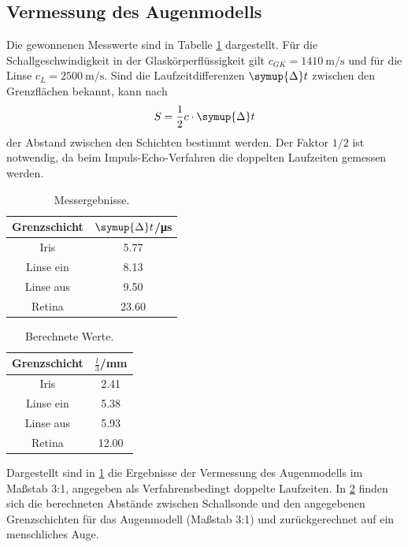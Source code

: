 \documentclass[
  bibliography=totoc,     %
  captions=tableheading,  %
  titlepage=firstiscover, %
]{scrartcl}
\begin{document}
\subsection{Vermessung des Augenmodells}
Die gewonnenen Messwerte sind in Tabelle \ref{tab:3} dargestellt. Für die Schallgeschwindigkeit\cite{anleitung}
in der Glaskörperflüssigkeit gilt $c_{GK} = \SI[per-mode=reciprocal]{1410}{\metre\per\second}$
und für die Linse $c_L = \SI[per-mode=reciprocal]{2500}{\metre\per\second}$. Sind die
Laufzeitdifferenzen $\symup{\Delta}t$ zwischen den Grenzflächen bekannt, kann nach
\begin{equation}
  S = \frac{1}{2} c \cdot \symup{\Delta}t
\end{equation}
der Abstand zwischen den Schichten bestimmt werden. Der Faktor $1/2$ ist notwendig,
da beim Impuls-Echo-Verfahren die doppelten Laufzeiten gemessen werden.
\begin{table}
\centering
  \begin{tabular}{c c}
    \toprule
    Grenzschicht & $\symup{\Delta}t$/\si{\micro\second} \\
    \midrule
    Iris & 5.77 \\
    Linse ein & 8.13 \\
    Linse aus & 9.50 \\
    Retina & 23.60 \\
    \bottomrule
  \end{tabular}
  \caption{Messergebnisse.}
  \label{tab:3}
\end{table}
\begin{table}
  \centering
  \begin{tabular}{c c}
    \toprule
    Grenzschicht & $\frac{l}{3}$/\si{\milli\metre} \\
    \midrule
    Iris & 2.41\\
    Linse ein & 5.38\\
    Linse aus & 5.93\\
    Retina & 12.00\\
    \bottomrule
  \end{tabular}
  \caption{Berechnete Werte.}
  \label{tab:4}
\end{table}
\noindent
Dargestellt sind in \ref{tab:3} die Ergebnisse der Vermessung des Augenmodells im Maßstab 3:1,
angegeben als Verfahrensbedingt doppelte Laufzeiten. In \ref{tab:4} finden sich
die berechneten Abstände zwischen Schallsonde und den angegebenen Grenzschichten
für das Augenmodell (Maßstab 3:1) und zurückgerechnet auf ein menschliches Auge.
\end{document}
